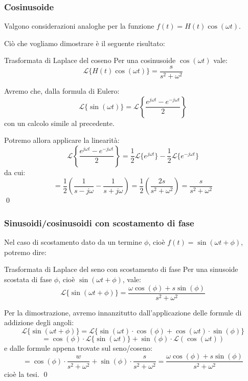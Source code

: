 \documentclass[a4paper,11pt]{article}
\begin{document}
\subsubsection{Cosinusoide}
Valgono considerazioni analoghe per la funzione $f(t) = H(t) \cos(\omega t)$.

Ciò che vogliamo dimostrare è il seguente risultato:
\begin{theorem}{Trasformata di Laplace del coseno}
	Per una cosinusoide $\cos(\omega t)$ vale:
	$$
		\mathcal{L}\{ H(t) \cos(\omega t) \} = \frac{s}{s^2 + \omega^2}
	$$
\end{theorem}

Avremo che, dalla formula di Eulero:
$$
\mathcal{L}\{\sin(\omega t)\} = \mathcal{L}\left\{ \frac{e^{j \omega t} - e^{- j \omega t}}{2} \right\}
$$
con un calcolo simile al precedente.

Potremo allora applicare la linearità:
$$
\mathcal{L}\left\{ \frac{e^{j \omega t} - e^{- j \omega t}}{2} \right\} = \frac{1}{2} \mathcal{L}\{e^{j \omega t}\} - \frac{1}{2} \mathcal{L}\{e^{-j \omega t}\}
$$
da cui:
$$
= \frac{1}{2}\left( \frac{1}{s - j\omega} - \frac{1}{s + j \omega} \right) = \frac{1}{2}\left( \frac{2s}{s^2 + \omega^2} \right) = \frac{s}{s^2 + \omega^2}
$$ \qed

\subsubsection{Sinusoidi/cosinusoidi con scostamento di fase}
Nel caso di scostamento dato da un termine $\phi$, cioè $f(t) = \sin(\omega t + \phi)$, potremo dire:
\begin{theorem}{Trasformata di Laplace del seno con scostamento di fase}
	Per una sinusoide scostata di fase $\phi$, cioè $\sin(\omega t + \phi)$, vale:
	$$
	\mathcal{L}\{ \sin(\omega t + \phi) \} = \frac{\omega \cos(\phi) + s \sin(\phi)}{s^2 + \omega^2}
	$$
\end{theorem}

Per la dimostrazione, avremo innanzitutto dall'applicazione delle formule di addizione degli angoli:
$$
\mathcal{L}\{\sin(\omega t + \phi)\} = \mathcal{L}\{ \sin(\omega t) \cdot \cos(\phi) + \cos(\omega t) \cdot \sin(\phi) \} 
$$
$$
= \cos(\phi) \cdot \mathcal{L} \{ \sin(\omega t) \} + \sin(\phi) \cdot \mathcal{L}(\cos (\omega t))
$$
e dalle formule appena trovate sul seno/coseno:
$$
= \cos(\phi) \cdot \frac{w}{s^2 + \omega ^2} + \sin(\phi) \cdot \frac{s}{s^2 + \omega ^2} = \frac{\omega \cos(\phi) + s \sin(\phi)}{s^2 + \omega^2}
$$
cioè la tesi. \qed
\end{document}
